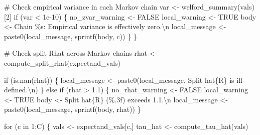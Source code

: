 \documentclass[
  letterpaper,
  DIV=11,
  numbers=noendperiod]{scrartcl}
\newenvironment{Shaded}{\begin{snugshade}}{\end{snugshade}}
\newcommand{\CharTok}[1]{\textcolor[rgb]{0.13,0.47,0.30}{#1}}
\newcommand{\CommentTok}[1]{\textcolor[rgb]{0.37,0.37,0.37}{#1}}
\newcommand{\ControlFlowTok}[1]{\textcolor[rgb]{0.00,0.23,0.31}{#1}}
\newcommand{\DecValTok}[1]{\textcolor[rgb]{0.68,0.00,0.00}{#1}}
\newcommand{\FloatTok}[1]{\textcolor[rgb]{0.68,0.00,0.00}{#1}}
\newcommand{\KeywordTok}[1]{\textcolor[rgb]{0.00,0.23,0.31}{#1}}
\newcommand{\NormalTok}[1]{\textcolor[rgb]{0.00,0.23,0.31}{#1}}
\newcommand{\OperatorTok}[1]{\textcolor[rgb]{0.37,0.37,0.37}{#1}}
\newcommand{\SpecialCharTok}[1]{\textcolor[rgb]{0.37,0.37,0.37}{#1}}
\newcommand{\StringTok}[1]{\textcolor[rgb]{0.13,0.47,0.30}{#1}}
\begin{document}
\begin{Shaded}
\begin{Highlighting}[]
      \CommentTok{\# Check empirical variance in each Markov chain}
\NormalTok{      var }\OperatorTok{\textless{}{-}}\NormalTok{ welford\_summary(vals)[}\DecValTok{2}\NormalTok{]}
      \ControlFlowTok{if}\NormalTok{ (var }\OperatorTok{\textless{}} \FloatTok{1e{-}10}\NormalTok{) \{}
\NormalTok{        no\_zvar\_warning }\OperatorTok{\textless{}{-}}\NormalTok{ FALSE}
\NormalTok{        local\_warning }\OperatorTok{\textless{}{-}}\NormalTok{ TRUE}
\NormalTok{        body }\OperatorTok{\textless{}{-}} \StringTok{\textquotesingle{}  Chain }\SpecialCharTok{\%s}\StringTok{: Empirical variance is effectively zero.}\CharTok{\textbackslash{}n}\StringTok{\textquotesingle{}}
\NormalTok{        local\_message }\OperatorTok{\textless{}{-}}\NormalTok{ paste0(local\_message, sprintf(body, c))}
\NormalTok{      \}}
\NormalTok{    \}}
  
    \CommentTok{\# Check split Rhat across Markov chains}
\NormalTok{    rhat }\OperatorTok{\textless{}{-}}\NormalTok{ compute\_split\_rhat(expectand\_vals)}

    \ControlFlowTok{if}\NormalTok{ (}\KeywordTok{is}\NormalTok{.nan(rhat)) \{}
\NormalTok{      local\_message }\OperatorTok{\textless{}{-}}\NormalTok{ paste0(local\_message,}
                              \StringTok{\textquotesingle{}  Split hat}\SpecialCharTok{\{R\}}\StringTok{ is ill{-}defined.}\CharTok{\textbackslash{}n}\StringTok{\textquotesingle{}}\NormalTok{)}
\NormalTok{    \} }\ControlFlowTok{else} \ControlFlowTok{if}\NormalTok{ (rhat }\OperatorTok{\textgreater{}} \FloatTok{1.1}\NormalTok{) \{}
\NormalTok{      no\_rhat\_warning }\OperatorTok{\textless{}{-}}\NormalTok{ FALSE}
\NormalTok{      local\_warning }\OperatorTok{\textless{}{-}}\NormalTok{ TRUE}
\NormalTok{      body }\OperatorTok{\textless{}{-}} \StringTok{\textquotesingle{}  Split hat}\SpecialCharTok{\{R\}}\StringTok{ (}\SpecialCharTok{\%.3f}\StringTok{) exceeds 1.1.}\CharTok{\textbackslash{}n}\StringTok{\textquotesingle{}}
\NormalTok{      local\_message }\OperatorTok{\textless{}{-}}\NormalTok{ paste0(local\_message, sprintf(body, rhat))}
\NormalTok{    \}}

    \ControlFlowTok{for}\NormalTok{ (c }\KeywordTok{in} \DecValTok{1}\NormalTok{:C) \{}
\NormalTok{      vals }\OperatorTok{\textless{}{-}}\NormalTok{ expectand\_vals[c,]}
\NormalTok{      tau\_hat }\OperatorTok{\textless{}{-}}\NormalTok{ compute\_tau\_hat(vals)}


\end{Highlighting}
\end{Shaded}
\end{document}
